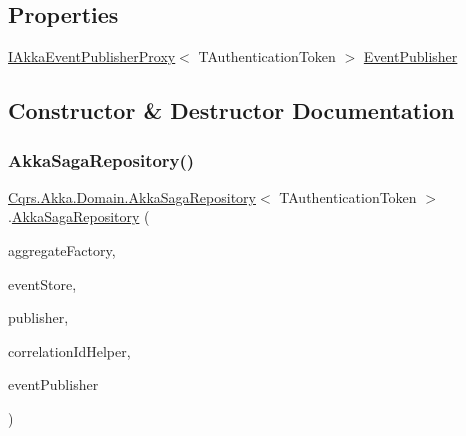 \subsection*{Properties}
\begin{DoxyCompactItemize}
\item 
\hyperlink{interfaceCqrs_1_1Akka_1_1Events_1_1IAkkaEventPublisherProxy}{I\+Akka\+Event\+Publisher\+Proxy}$<$ T\+Authentication\+Token $>$ \hyperlink{classCqrs_1_1Akka_1_1Domain_1_1AkkaSagaRepository_a25957859d1f98ea7f434983c562e9724}{Event\+Publisher}
\end{DoxyCompactItemize}


\subsection{Constructor \& Destructor Documentation}
\mbox{\label{classCqrs_1_1Akka_1_1Domain_1_1AkkaSagaRepository_a8297f64e2b7a7be7bcc999c89dcece05}} 
\subsubsection{\texorpdfstring{Akka\+Saga\+Repository()}{AkkaSagaRepository()}}
{\footnotesize\ttfamily \hyperlink{classCqrs_1_1Akka_1_1Domain_1_1AkkaSagaRepository}{Cqrs.\+Akka.\+Domain.\+Akka\+Saga\+Repository}$<$ T\+Authentication\+Token $>$.\hyperlink{classCqrs_1_1Akka_1_1Domain_1_1AkkaSagaRepository}{Akka\+Saga\+Repository} (\begin{DoxyParamCaption}\item[{\hyperlink{interfaceCqrs_1_1Domain_1_1Factories_1_1IAggregateFactory}{I\+Aggregate\+Factory}}]{aggregate\+Factory,  }\item[{\hyperlink{interfaceCqrs_1_1Events_1_1IEventStore}{I\+Event\+Store}$<$ T\+Authentication\+Token $>$}]{event\+Store,  }\item[{\hyperlink{interfaceCqrs_1_1Events_1_1IEventPublisher}{I\+Event\+Publisher}$<$ T\+Authentication\+Token $>$}]{publisher,  }\item[{I\+Correlation\+Id\+Helper}]{correlation\+Id\+Helper,  }\item[{\hyperlink{interfaceCqrs_1_1Akka_1_1Events_1_1IAkkaEventPublisherProxy}{I\+Akka\+Event\+Publisher\+Proxy}$<$ T\+Authentication\+Token $>$}]{event\+Publisher }\end{DoxyParamCaption})}



